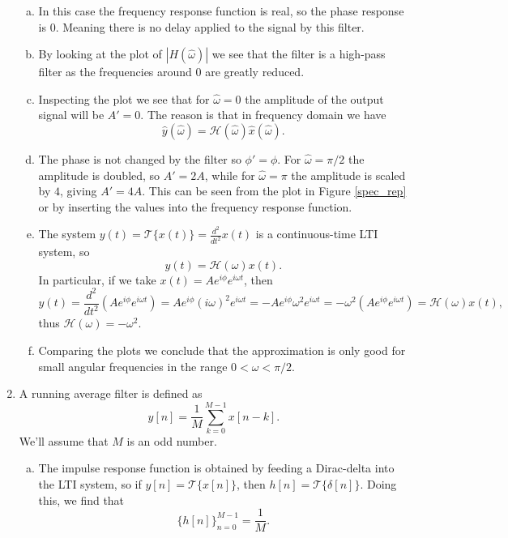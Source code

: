 \begin{enumerate}
\begin{enumerate}[a)]
\item In this case the frequency response function is real, so the phase response is $0$. Meaning there is no delay applied to the signal by this filter.

\item By looking at the plot of $|H(\hat{\omega})|$ we see that the filter is a high-pass filter as the frequencies around $0$ are greatly reduced. 

\item Inspecting the plot we see that for $\hat{\omega}=0$ the amplitude of the output signal will be $A'=0$. The reason is that in frequency domain we have
$$\hat{y}(\hat{\omega})=\mathcal{H}(\hat{\omega})\hat{x}(\hat{\omega}).$$

\item The phase is not changed by the filter so $\phi'=\phi$. For $\hat{\omega}=\pi/2$ the amplitude is doubled, so $A'=2A$, while for $\hat{\omega}=\pi$ the amplitude is scaled by $4$, giving $A'=4A$. This can be seen from the plot in Figure \ref{spec_rep} or by inserting the values into the frequency response function. 

\item The system $y(t)=\mathcal{T}\{x(t)\}=\frac{d^{2}}{dt^{2}}x(t)$ is a continuous-time LTI system, so
$$y(t)=\mathcal{H}(\omega)x(t).$$
In particular, if we take $x(t)=Ae^{i\phi}e^{i\omega t}$, then
$$y(t)=\frac{d^{2}}{dt^{2}}(Ae^{i\phi}e^{i\omega t})=Ae^{i\phi}(i\omega)^{2}e^{i\omega t}=-Ae^{i\phi}\omega^{2}e^{i\omega t}=-\omega^{2}(Ae^{i\phi}e^{i\omega t})=\mathcal{H}(\omega)x(t),$$
thus $\mathcal{H}(\omega)=-\omega^{2}$. 

\item Comparing the plots we conclude that the approximation is only good for small angular frequencies in the range $0<\omega<\pi/2$. 
\end{enumerate}

\item A running average filter is defined as
$$y[n]=\frac{1}{M}\sum_{k=0}^{M-1}x[n-k].$$
We'll assume that $M$ is an odd number. 

\begin{enumerate}[a)]
\item The impulse response function is obtained by feeding a Dirac-delta into the LTI system, so if $y[n]=\mathcal{T}\{x[n]\}$, then $h[n]=\mathcal{T}\{\delta[n]\}$. Doing this, we find that
$$\{h[n]\}_{n=0}^{M-1}=\frac{1}{M}.$$


\end{enumerate}
\end{enumerate}
